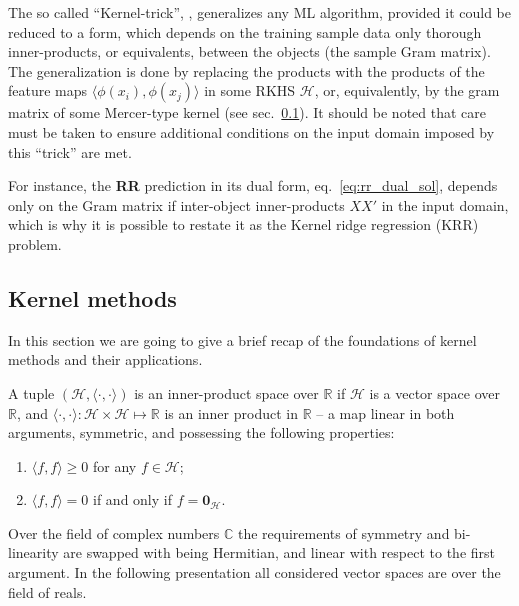 \documentclass{ITaSconf}
\newcommand{\Hcal}{\mathcal{H}}
\newcommand{\Real}{\mathbb{R}}
\newcommand{\nil}{\mathbf{0}}
\newcommand{\Cplx}{\mathbb{C}}
\begin{document}
The so called ``Kernel-trick'', \cite{kernel_trick}, generalizes any ML algorithm,
provided it could be reduced to a form, which depends on the training sample data
only thorough inner-products, or equivalents, between the objects (the sample Gram
matrix). The generalization is done by replacing the products with the products of
the feature maps $\langle\phi(x_i),\phi(x_j)\rangle$ in some RKHS $\Hcal$, or, equivalently,
by the gram matrix of some Mercer-type kernel (see sec.~\ref{sub:kernel_methods}).
It should be noted that care must be taken to ensure additional conditions on the
input domain imposed by this ``trick'' are met.

For instance, the \textbf{RR} prediction in its dual form, eq.~\ref{eq:rr_dual_sol},
depends only on the Gram matrix if inter-object inner-products $X X'$ in the input
domain, which is why it is possible to restate it as the Kernel ridge regression (KRR)
problem.

\subsection{Kernel methods} %
\label{sub:kernel_methods}

In this section we are going to give a brief recap of the foundations of kernel methods
and their applications.

A tuple $(\Hcal, \langle\cdot, \cdot\rangle)$ is an inner-product space over $\Real$
if $\Hcal$ is a vector space over $\Real$, and $\langle\cdot, \cdot\rangle : \Hcal
\times \Hcal \mapsto \Real$ is an inner product in $\Real$ -- a map linear in both
arguments, symmetric, and possessing the following properties:
\begin{enumerate}
  \item $\langle f, f\rangle\geq 0$ for any $f\in \Hcal$;
  \item $\langle f, f\rangle = 0$ if and only if $f = \nil_\Hcal$.
\end{enumerate}
Over the field of complex numbers $\Cplx$ the requirements of symmetry and bi-
linearity are swapped with being Hermitian, and linear with respect to the first
argument. In the following presentation all considered vector spaces are over the
field of reals.
\end{document}
